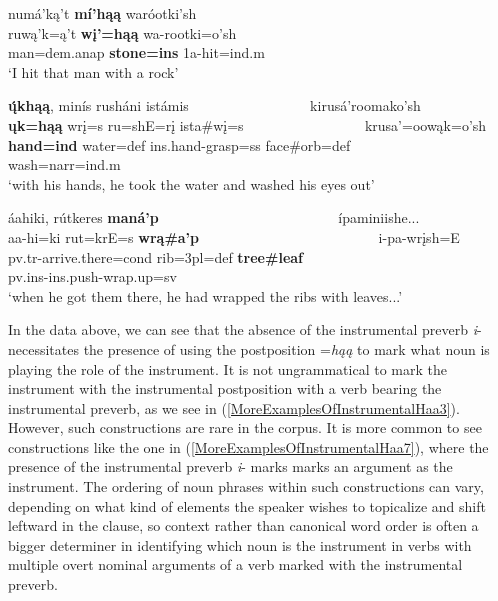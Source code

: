 \begin{exe}
\begin{xlist}
\item\label{MoreExamplesOfInstrumentalHaa5} \glll numá'ką't \textbf{mí'hąą} waróotki'sh\\
    ruwą'k=ą't \textbf{wį'=hąą} wa-rootki=o'sh\\
    \textnormal{man}=dem.anap \textbf{\textnormal{\bfseries stone}=ins} 1a-\textnormal{hit}=ind.m\\
    \glt `I hit that man with a rock' \citep[432]{hollow1970}
    
\item\label{MoreExamplesOfInstrumentalHaa6} \glll \textbf{ų́khąą}, minís rusháni istámis ~ ~ ~ ~ ~ ~ ~ ~ ~ ~  kirusá'roomako'sh\\
    \textbf{ųk=hąą} wrį=s ru=shE=rį ista\#wį=s ~ ~ ~ ~ ~ ~ ~ ~ ~ ~ krusa'=oowąk=o'sh\\
    \textbf{\textnormal{\bfseries hand}=ind} \textnormal{water}=def ins.hand-\textnormal{grasp}=ss \textnormal{face}\#\textnormal{orb}=def ~ ~ ~ ~ ~ ~ ~ ~ ~ ~ \textnormal{wash}=narr=ind.m\\
    \glt `with his hands, he took the water and washed his eyes out' \citep[37]{hollow1973a}
    
\item\label{MoreExamplesOfInstrumentalHaa7} \glll áahiki, rútkeres \textbf{maná'p} ~ ~ ~ ~ ~ ~ ~ ~ ~ ~ ~ ~ ~ ~ ~  ípaminiishe...\\
    aa-hi=ki rut=krE=s \textbf{wrą\#a'p} ~ ~ ~ ~ ~ ~ ~ ~ ~ ~ ~ ~ ~ ~ ~  i-pa-wrįsh=E\\
    pv.tr-\textnormal{arrive.there}=cond \textnormal{rib}=3pl=def \textbf{\textnormal{\bfseries tree}\#\textnormal{\bfseries leaf}} ~ ~ ~ ~ ~ ~ ~ ~ ~ ~ ~ ~ ~ ~ ~  pv.ins-ins.push-\textnormal{wrap.up}=sv\\
    \glt `when he got them there, he had wrapped the ribs with leaves...' \citep[177]{hollow1973a}
    

\end{xlist}
\end{exe}

In the data above, we can see that the absence of the instrumental preverb \textit{i}- necessitates the presence of using the postposition =\textit{hąą} to mark what noun is playing the role of the instrument. It is not ungrammatical to mark the instrument with the instrumental postposition with a verb bearing the instrumental preverb, as we see in (\ref{MoreExamplesOfInstrumentalHaa3}). However, such constructions are rare in the corpus. It is more common to see constructions like the one in (\ref{MoreExamplesOfInstrumentalHaa7}), where the presence of the instrumental preverb \textit{i}- marks marks an argument as the instrument. The ordering of noun phrases within such constructions can vary, depending on what kind of elements the speaker wishes to topicalize and shift leftward in the clause, so context rather than canonical word order is often a bigger determiner in identifying which noun is the instrument in verbs with multiple overt nominal arguments of a verb marked with the instrumental preverb.

